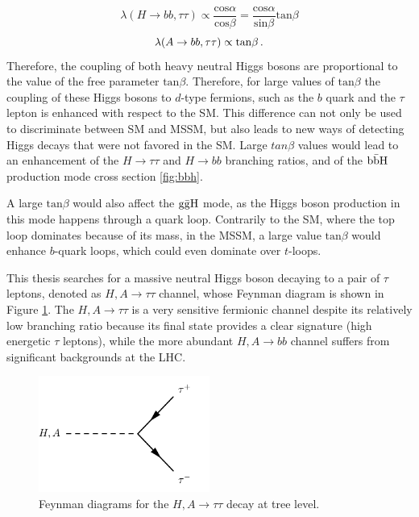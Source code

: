 \begin{equation}
    \lambda(H \rightarrow bb, \tau\tau) \propto \frac{\mathrm{cos} \alpha}{\mathrm{cos} \beta} = \frac{\mathrm{cos} \alpha}{\mathrm{sin} \beta} \mathrm{tan} \beta
\end{equation}
\begin{equation}
    \lambda(A \rightarrow bb, \tau\tau) \propto \mathrm{tan} \beta \mend
\end{equation}
Therefore, the coupling of both heavy neutral Higgs bosons are proportional to the value of the free parameter $\mathrm{tan} \beta$. Therefore, for large values of $\mathrm{tan} \beta$ the coupling of these Higgs bosons to $d$-type fermions, such as the $b$ quark and the $\tau$ lepton is enhanced with respect to the SM. This difference can not only be used to discriminate between SM and MSSM, but also leads to new ways of detecting Higgs decays that were not favored in the SM. Large $tan \beta$ values would lead to an enhancement of the $H \rightarrow \tau\tau$ and $H \rightarrow bb$ branching ratios, and of the $\mathrm{b\Bar{b}H}$ production mode cross section \ref{fig:bbh}.

A large $\mathrm{tan} \beta$ would also affect the $\mathrm{g\Bar{g}H}$ mode, as the Higgs boson production in this mode happens through a quark loop. Contrarily to the SM, where the top loop dominates because of its mass, in the MSSM, a large value $\mathrm{tan} \beta$ would enhance $b$-quark loops, which could even dominate over $t$-loops.\newline


This thesis searches for a massive neutral Higgs boson decaying to a pair of $\tau$ leptons, denoted as $H, A \rightarrow \tau\tau$ channel, whose Feynman diagram is shown in Figure \ref{fig:htt}. The $H,A \rightarrow \tau\tau$ is a very sensitive fermionic channel despite its relatively low branching ratio because its final state provides a clear signature (high energetic $\tau$ leptons), while the more abundant $H,A \rightarrow bb$ channel suffers from significant backgrounds at the LHC.

\begin{figure}
    \centering
    \includegraphics[width=0.5\textwidth]{Images/htt.pdf}
    \caption{Feynman diagrams for the $H,A \rightarrow \tau\tau$ decay at tree level.}
    \label{fig:htt}
\end{figure}

